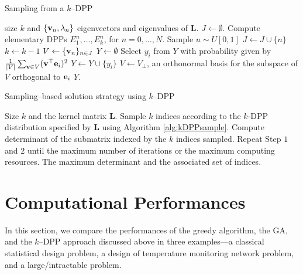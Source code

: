 \documentclass[]{interact}
\theoremstyle{plain}%
\theoremstyle{definition}
\theoremstyle{remark}
\newcommand{\matr}[1]{\bm{#1}}
\begin{document}
\begin{algorithm}[tbh]
\caption{Sampling from a $k$--DPP}
\label{alg:kDPPsample}
\begin{algorithmic}
\REQUIRE size $k$ and $\{{\bf v}_n, \lambda_n\}$ eigenvectors and eigenvalues of $\matr{L}$.
\STATE $J \leftarrow \emptyset$.
\STATE Compute elementary DPPs $E_{1}^{n}, \dots, E_{k}^{n}$, for $n = 0, \dots, N$.
        \STATE Sample $u \sim U[0,1]$
        \STATE $J \leftarrow J \cup \{n\}$
        \STATE $k \leftarrow k-1$
        \ENDIF
        \ENDIF
\ENDFOR
\STATE $V \leftarrow \{{\bf v}_n\}_{n \in J}$
\STATE $Y \leftarrow \emptyset$
\STATE Select $y_i$ from $Y$ with probability given by $\frac{1}{|V|} \sum_{{\bf v} \in V} ({\bf v}^{\top} {\bf e}_i)^2$
\STATE $Y \leftarrow Y \cup \{y_i\}$
\STATE $V \leftarrow V_{\bot}$, an orthonormal basis for the subspace of $V$ orthogonal to ${\bf e}_i$
\ENDWHILE
\ENSURE $Y$.
\end{algorithmic}
\end{algorithm}


\begin{algorithm}[tbh]
\caption{Sampling--based solution strategy using $k$--DPP}
\label{alg:SamplingSoln}
\begin{algorithmic}[1]
\REQUIRE Size $k$ and the kernel matrix $\matr{L}$.
\STATE Sample $k$ indices according to the $k$-DPP distribution specified by $\matr{L}$ using Algorithm \ref{alg:kDPPsample}.
\STATE Compute determinant of the submatrix indexed by the $k$ indices sampled.
\STATE Repeat Step $1$ and $2$ until the maximum number of iterations or the maximum computing resources.
\ENSURE The maximum determinant and the associated set of indices.
\end{algorithmic}
\end{algorithm}


\section{Computational Performances}\label{examples}

In this section, we compare the performances of the greedy algorithm, the GA, and the $k$--DPP approach discussed above in three examples---a classical statistical design problem, a design of temperature monitoring network problem, and a large/intractable problem.
\end{document}
